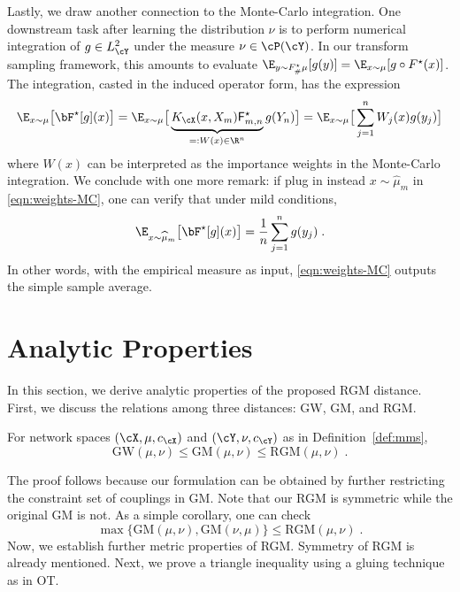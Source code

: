 \documentclass[11pt]{article}
\begin{document}
\begin{remark}
	Lastly, we draw another connection to the Monte-Carlo integration. One downstream task after learning the distribution $\nu$ is to perform numerical integration of $g \in L^2_\cY$ under the measure $\nu \in \cP(\cY)$. In our transform sampling framework, this amounts to evaluate $\E_{y \sim F^\star_\# \mu}[ g(y)] = \E_{x \sim \mu}[ g\circ F^\star (x)]$. The integration, casted in the induced operator form, has the expression
	\begin{align}
		\label{eqn:weights-MC}
		\E_{x \sim \mu} \big[ \bF^\star[g](x) \big] = \E_{x \sim \mu}  \big[ \underbrace{K_\cX(x, X_m) \mathsf{F}_{m,n}^\star}_{=: W(x) \in \R^n } g(Y_n) \big] = \E_{x \sim \mu} \big[ \sum_{j=1}^n W_j(x) g(y_j) \big]
	\end{align}
	where $W(x)$ can be interpreted as the importance weights in the Monte-Carlo integration. We conclude with one more remark: if plug in instead $x \sim \widehat{\mu}_m$ in \eqref{eqn:weights-MC}, one can verify that under mild conditions, 
	\begin{align}
		\E_{x \sim \widehat{\mu}_m} \big[ \bF^\star[g](x) \big] = \frac{1}{n} \sum_{j=1}^n  g(y_j) \;.
	\end{align}
	In other words, with the empirical measure as input, \eqref{eqn:weights-MC} outputs the simple sample average. 
\end{remark}




\section{Analytic Properties}
\label{sec:analytic-properties}
In this section, we derive analytic properties of the proposed RGM distance. First, we discuss the relations among three distances: GW, GM, and RGM.
\begin{proposition}\label{prop:1}
	For network spaces $(\cX, \mu, c_{\cX})$ and $(\cY, \nu, c_{\cY})$ as in Definition~\ref{def:mms},
	\begin{equation*}
		\mathrm{GW}(\mu, \nu) \le \mathrm{GM}(\mu, \nu) \le \mathrm{RGM}(\mu, \nu)\;.
	\end{equation*}
\end{proposition}

The proof follows because our formulation can be obtained by further restricting the constraint set of couplings in GM. Note that our RGM is symmetric while the original GM is not. As a simple corollary, one can check
\begin{equation*}
		\max\{\mathrm{GM}(\mu, \nu), \mathrm{GM}(\nu, \mu)\}
		\le \mathrm{RGM}(\mu, \nu)\;.
\end{equation*}
Now, we establish further metric properties of RGM. Symmetry of RGM is already mentioned. Next, we prove a triangle inequality using a gluing technique as in OT.
\end{document}
